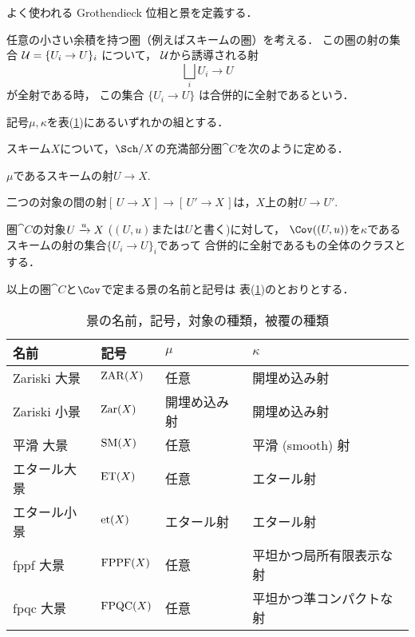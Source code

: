     よく使われる Grothendieck 位相と景を定義する．

    \begin{Def}
        任意の小さい余積を持つ圏（例えばスキームの圏）を考える．
        この圏の射の集合 $\mathcal{U}=\{U_i \to U\}_i$ について，
        $\mathcal{U}$から誘導される射
        \[ \bigsqcup_i U_i \to U \]が全射である時，
        この集合 $\{U_i \to U\}$ は合併的に全射であるという．
    \end{Def}

    \begin{Def}\label{def:zar_et_fppf_site}
        記号$\mu, \kappa$を表(\ref{table:top_tau_and_mu})にあるいずれかの組とする．

        スキーム$X$について，$\Sch/X$の充満部分圏$\cat{C}$を次のように定める．
        \begin{description}[labelindent=5mm]
            \item[\underline{対象}]
                $\mu$であるスキームの射$U \to X$.
            \item[\underline{射}]
                二つの対象の間の射$[\,U \to X\,] \to [\,U' \to X\,]$は，$X$上の射$U \to U'$.
        \end{description}
        圏$\cat{C}$の対象$U \xrightarrow{u} X$ ($(U,u)$または$U$と書く)に対して，
        $\Cov((U,u))$を$\kappa$であるスキームの射の集合$\{U_i \to U\}_i$であって
        合併的に全射であるもの全体のクラスとする．

        以上の圏$\cat{C}$と$\Cov$で定まる景の名前と記号は
        表(\ref{table:top_tau_and_mu})のとおりとする．
    \end{Def}

    \begin{table}[htb]
    \centering
    \caption{景の名前，記号，対象の種類，被覆の種類}
    \label{table:top_tau_and_mu}
    \begin{tabular}{@{}llll@{}}
        \toprule
        名前 & 記号 & $\mu$ & $\kappa$ \\ \midrule
        Zariski 大景 & $\mathrm{ZAR}(X)$ & 任意 & 開埋め込み射 \\
        Zariski 小景 & $\mathrm{Zar}(X)$ & 開埋め込み射 & 開埋め込み射 \\
        平滑 大景 & $\mathrm{SM}(X)$ & 任意 & 平滑 (smooth) 射 \\
        エタール大景 & $\mathrm{ET}(X)$ & 任意 & エタール射 \\
        エタール小景 & $\mathrm{et}(X)$ & エタール射 & エタール射 \\
        fppf 大景 & $\mathrm{FPPF}(X)$ & 任意 & 平坦かつ局所有限表示な射 \\
        fpqc 大景 & $\mathrm{FPQC}(X)$ & 任意 & 平坦かつ準コンパクトな射 \\ \bottomrule
    \end{tabular}
    \end{table}

